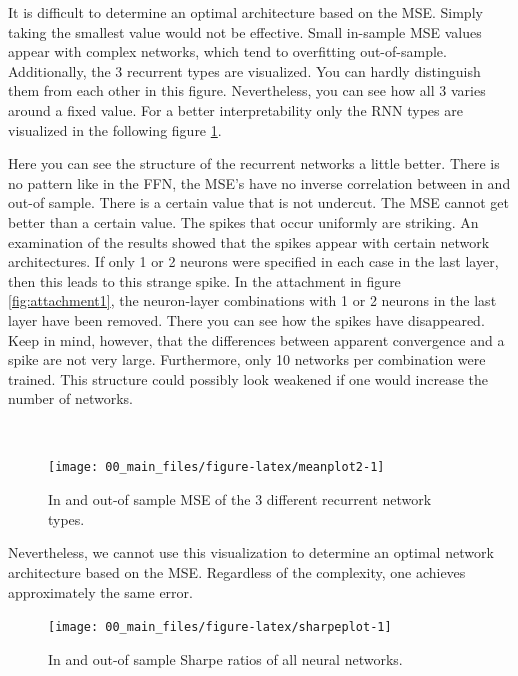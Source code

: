 \documentclass[
]{article}
\begin{document}
It is difficult to determine an optimal architecture based on the MSE.
Simply taking the smallest value would not be effective. Small in-sample
MSE values appear with complex networks, which tend to overfitting
out-of-sample. Additionally, the 3 recurrent types are visualized. You
can hardly distinguish them from each other in this figure.
Nevertheless, you can see how all 3 varies around a fixed value. For a
better interpretability only the RNN types are visualized in the
following figure \ref{fig:meanplot2}.

\newpage

Here you can see the structure of the recurrent networks a little
better. There is no pattern like in the FFN, the MSE's have no inverse
correlation between in and out-of sample. There is a certain value that
is not undercut. The MSE cannot get better than a certain value. The
spikes that occur uniformly are striking. An examination of the results
showed that the spikes appear with certain network architectures. If
only 1 or 2 neurons were specified in each case in the last layer, then
this leads to this strange spike. In the attachment in figure
\ref{fig:attachment1}, the neuron-layer combinations with 1 or 2 neurons
in the last layer have been removed. There you can see how the spikes
have disappeared. Keep in mind, however, that the differences between
apparent convergence and a spike are not very large. Furthermore, only
10 networks per combination were trained. This structure could possibly
look weakened if one would increase the number of networks.

~

\begin{figure}

{\centering \texttt{[image: 00\_main\_files/figure-latex/meanplot2-1]} 

}

\caption{In and out-of sample MSE of the 3 different recurrent network types.}\label{fig:meanplot2}
\end{figure}

Nevertheless, we cannot use this visualization to determine an optimal
network architecture based on the MSE. Regardless of the complexity, one
achieves approximately the same error.

\newpage

\begin{figure}

{\centering \texttt{[image: 00\_main\_files/figure-latex/sharpeplot-1]} 

}

\caption{In and out-of sample Sharpe ratios of all neural networks.}\label{fig:sharpeplot}
\end{figure}
\end{document}
